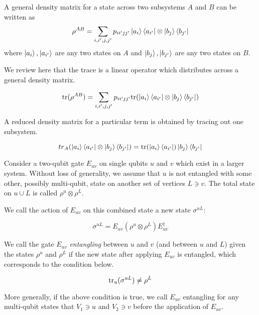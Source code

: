 A general density matrix for a state across two subsystems $A$ and $B$ can be
written as
\begin{equation}
\rho^{AB} = \sum_{i,i',j,j'} p_{ii'jj'} \left\vert{a_i}\right\rangle\left\langle{a_{i'}}\right\vert \otimes \left\vert{b_j}\right\rangle\left\langle{b_{j'}}\right\vert
\end{equation}
where $\left\vert{a_i}\right\rangle,\left\vert{a_{i'}}\right\rangle$ are any two states on $A$ and
$\left\vert{b_j}\right\rangle,\left\vert{b_{j'}}\right\rangle$ are any two states on $B$.

We review here that the trace is a linear operator which distributes across
a general density matrix.

\begin{equation}
\text{tr}(\rho^{AB}) = \sum_{i,i',j,j'} p_{ii'jj'} \text{tr} (\left\vert{a_i}\right\rangle\left\langle{a_{i'}}\right\vert \otimes \left\vert{b_j}\right\rangle\left\langle{b_{j'}}\right\vert)
\end{equation}

A reduced density matrix for a particular term is obtained by tracing out
one subsystem.

\begin{equation}
tr_A(\left\vert{a_i}\right\rangle\left\langle{a_{i'}}\right\vert \otimes \left\vert{b_j}\right\rangle\left\langle{b_{j'}}\right\vert) = \text{tr}(\left\vert{a_i}\right\rangle\left\langle{a_{i'}}\right\vert) \left\vert{b_j}\right\rangle\left\langle{b_{j'}}\right\vert
\end{equation}

Consider a two-qubit gate $E_{uv}$ on single qubits $u$ and $v$ which exist
in a larger system.
Without loss of generality, we assume that $u$ is
not entangled with some other, possibly multi-qubit,
state on another set of vertices $L \ni v$.
The total state on $u \cup L$ is called $\rho^{u}\otimes \rho^{L}$.

We call the action of $E_{uv}$ on this combined state a new state $\sigma^{uL}$:

\begin{equation}
\sigma^{uL} = E_{uv} (\rho^{u}\otimes \rho^{L}) E^{\dagger}_{uv}
\end{equation}

We call the gate $E_{uv}$ \emph{entangling} between $u$ and $v$
(and between $u$ and $L$) given the states $\rho^{u}$ and $\rho^{L}$ if
the new state after applying $E_{uv}$ is entangled, which corresponds to
the condition below.

\begin{equation}
\text{tr}_{u}( \sigma^{uL} ) \ne \rho^{L}
\end{equation}

More generally, if the above condition is true,
we call $E_{uv}$ entangling for any multi-qubit
states that $V_1 \ni u$ and $V_2 \ni v$ before the application of $E_{uv}$.

